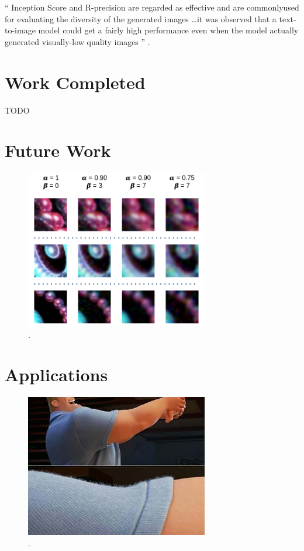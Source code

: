 \documentclass[letterpaper]{article} %
\begin{document}
``
Inception Score and R-precision are regarded as effective and are commonlyused 
for evaluating the diversity of the generated images \dots it was observed 
that 
a
text-to-image model could get a fairly high performance even when the model 
actually generated
visually-low quality images
''
\cite{leica}.

\section{Work Completed}
TODO

\section{Future Work}
\begin{figure}[htbp]
\centerline{\includegraphics[width=8cm]{altered_data.png}}
\caption{.}
\label{fig:altered}
\end{figure}

\section{Applications}
\begin{figure}[htbp]
\centerline{\includegraphics[width=8cm]{incredibles.png}}
\caption{.}
\label{fig:incredibles}
\end{figure}
\end{document}
